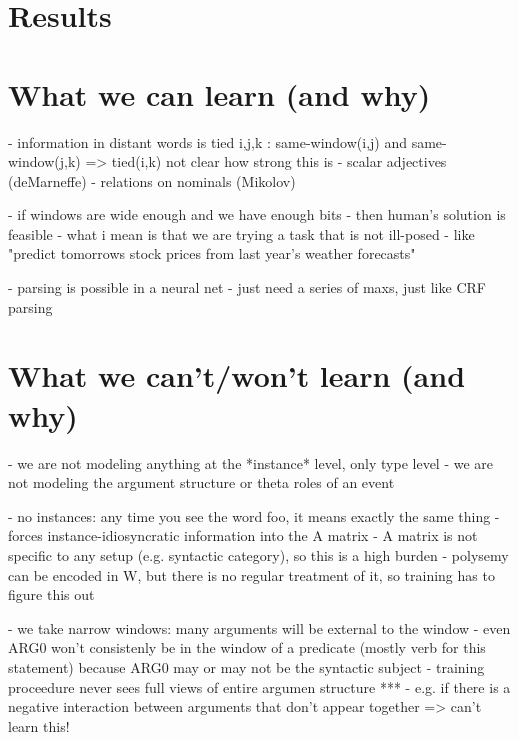 \documentclass[11pt,letterpaper]{article}
\begin{document}
\section{Results} %





\section{What we can learn (and why)} %
- information in distant words is tied
	i,j,k : same-window(i,j) and same-window(j,k) => tied(i,k)
	not clear how strong this is
- scalar adjectives (deMarneffe)
- relations on nominals (Mikolov)

- if windows are wide enough and we have enough bits
	- then human's solution is feasible
	- what i mean is that we are trying a task that is not ill-posed
		- like "predict tomorrows stock prices from last year's weather forecasts"

- parsing is possible in a neural net
	- just need a series of maxs, just like CRF parsing


\section{What we can't/won't learn (and why)} %
\label{section:unlearnability}
- we are not modeling anything at the *instance* level, only type level
- we are not modeling the argument structure or theta roles of an event

- no instances: any time you see the word foo, it means exactly the same thing
	- forces instance-idiosyncratic information into the A matrix
	- A matrix is not specific to any setup (e.g. syntactic category), so this is a high burden
	- polysemy can be encoded in W, but there is no regular treatment of it, so training has to figure this out

- we take narrow windows: many arguments will be external to the window
	- even ARG0 won't consistenly be in the window of a predicate (mostly verb for this statement)
		because ARG0 may or may not be the syntactic subject
	- training proceedure never sees full views of entire argumen structure
	***	- e.g. if there is a negative interaction between arguments that don't appear together => can't learn this!
\end{document}
